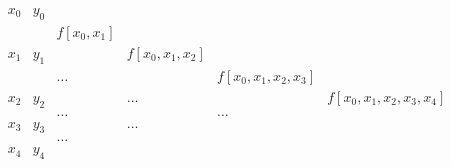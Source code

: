 \documentclass{report}
\begin{document}
\[
	\begin{array}{cccccc}
		x_0 & y_0                                                                             \\
		    &     & f[x_0,x_1]                                                                \\
		x_1 & y_1 &            & f[x_0,x_1,x_2]                                               \\
		    &     & \dots      &                & f[x_0,x_1,x_2,x_3]                          \\
		x_2 & y_2 &            & \dots          &                    & f[x_0,x_1,x_2,x_3,x_4] \\
		    &     & \dots      &                & \dots                                       \\
		x_3 & y_3 &            & \dots                                                        \\
		    &     & \dots                                                                     \\
		x_4 & y_4
	\end{array}
\]

\end{document}
